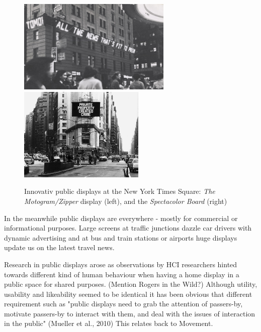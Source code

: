 
\begin{figure} [h!]
    \centering
        \includegraphics[height=4.5cm]{Illustrations/zipper.jpg}
        \includegraphics[height=4.5cm]{Illustrations/Spectacolor_JennyHolzer_.jpg}
    \caption[First public displays]{Innovativ public displays at the New York Times Square: \textit{The Motogram/Zipper} display (left), and the \textit{Spectacolor Board} (right)}
    \label{DigitalSignage}
\end{figure}


In the meanwhile public displays  are everywhere - mostly for commercial or informational purposes. Large screens at traffic junctions dazzle car drivers with dynamic advertising and at bus and train stations or airports huge displays update us on the latest travel news.  

Research in public displays  arose as observations by HCI researchers hinted towards different kind of human behaviour when having a home display in a public space for shared purposes. 
(Mention Rogers in the Wild?)
Although utility, usability and likeability seemed to be identical it has been obvious that different requirement such as "public displays need to grab the attention of passers-by, motivate passers-by to interact with them, and deal with the issues of interaction in the public" (Mueller et al., 2010) 
This relates back to Movement.

